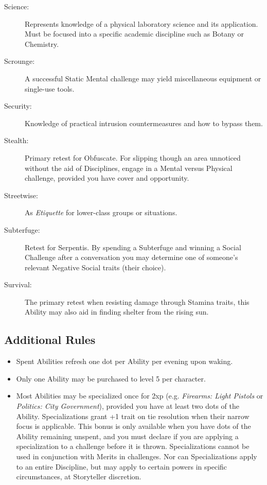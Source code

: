 \begin{description}
	\item[Science:]  Represents knowledge of a physical laboratory science and its application.  Must be focused 
	into a specific academic discipline such as Botany or Chemistry.
	\item[Scrounge:]  A successful Static Mental challenge may yield miscellaneous equipment or single-use tools.
	\item[Security:]  Knowledge of practical intrusion countermeasures and how to bypass them.
	\item[Stealth:]  Primary retest for Obfuscate.  For slipping though an area unnoticed without the aid of 
	Disciplines, engage in a Mental versus Physical challenge, provided you have cover and opportunity.
	\item[Streetwise:]  As \emph{Etiquette} for lower-class groups or situations.
	\item[Subterfuge:]  Retest for Serpentis.  By spending a Subterfuge and winning a Social Challenge after a conversation you may determine one of someone's relevant Negative Social traits (their choice).
	\item[Survival:]  The primary retest when resisting damage through Stamina traits, this Ability may also 
	aid in finding shelter from the rising sun.
\end{description}

\subsection{Additional Rules}

\begin{itemize}
	\item Spent Abilities refresh one dot per Ability per evening upon waking.
	\item Only one Ability may be purchased to level 5 per character.
	\item Most Abilities may be specialized once for 2xp (e.g. \emph{Firearms: Light Pistols} or \emph{Politics: 
	City Government}), provided you have at least two dots of the Ability.  Specializations grant +1 trait 
	on tie resolution when their narrow focus is applicable.  This bonus is only available when you have dots 
	of the Ability remaining unspent, and you must declare if you are applying a specialization to a challenge 
	before it is thrown. Specializations cannot be used in conjunction with Merits in challenges.  Nor can 
	Specializations apply to an entire Discipline, but may apply to certain powers in specific circumstances, 
	at Storyteller discretion.
\end{itemize}
